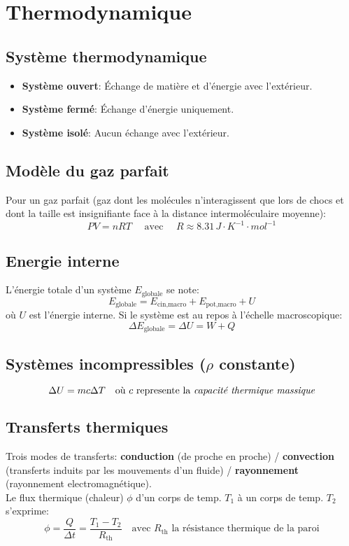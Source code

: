 \documentclass[a5paper,10pt]{article}
\begin{document}
\section{Thermodynamique}
\subsection{Système thermodynamique}
\begin{itemize}[noitemsep]
    \item \textbf{Système ouvert}: Échange de matière et d'énergie avec l'extérieur.
    \item \textbf{Système fermé}: Échange d'énergie uniquement.
    \item \textbf{Système isolé}: Aucun échange avec l'extérieur.
\end{itemize}
\subsection{Modèle du gaz parfait}
Pour un gaz parfait (gaz dont les molécules n'interagissent que lors de chocs et dont la taille est insignifiante face à la distance intermoléculaire moyenne):
$$PV=nRT \quad\text{ avec }\quad R\approx8.31 \,J\cdot K^{-1}\cdot mol^{-1}$$
\subsection{Energie interne}
L'énergie totale d'un système $E_\text{globale}$ se note:
$$E_\text{globale} =  E_\text{cin,macro}  +  E_\text{pot,macro} + U$$
où $U$ est l'énergie interne. Si le système est au repos à l'échelle macroscopique:
$$\Delta E_\text{globale} = \Delta U = W+Q$$
\subsection{Systèmes incompressibles ($\rho$ constante)}
$$\Delta U = mc\Delta T \quad \text{où $c$ represente la \textit{capacité thermique massique}}$$
\subsection{Transferts thermiques}
Trois modes de transferts: \textbf{conduction} (de proche en proche) / \textbf{convection} (transferts induits par les mouvements d'un fluide) / \textbf{rayonnement} (rayonnement electromagnétique).\\[4pt]
Le flux thermique (chaleur) $\phi$ d'un corps de temp. $T_1$ à un corps de temp. $T_2$ s'exprime:
$$\phi = \frac{Q}{\Delta t} = \frac{T_1-T_2}{R_{\text{th}}} \quad \text{avec $R_{\text{th}}$ la résistance thermique de la paroi}$$
\end{document}
